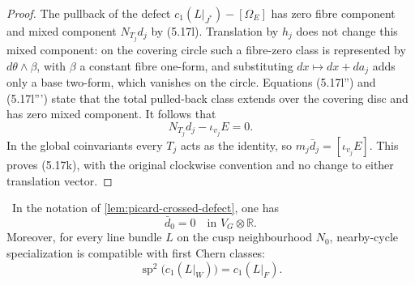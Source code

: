 \begin{proof}
The pullback of the defect
\(c_1(L|_{J^*})-[\Omega_E]\) has zero fibre component and mixed
component \(N_{T_j}d_j\) by (5.17l).  Translation by \(h_j\) does
not change this mixed component: on the covering circle such
a fibre-zero class is represented by
\(d\theta\wedge\beta\), with \(\beta\) a constant fibre one-form,
and substituting \(dx\mapsto dx+d a_j\) adds only a base two-form,
which vanishes on the circle.  Equations (5.17l'') and
(5.17l''') state that the total pulled-back class extends over
the covering disc and has zero mixed component.  It follows that
\[
 N_{T_j}d_j-\iota_{v_j}E=0.
\]
In the global coinvariants every \(T_j\) acts as the identity,
so \(m_j\bar d_j=[\iota_{v_j}E]\).  This proves (5.17k), with the
original clockwise convention and no change to either translation
vector.
\end{proof}

\begin{lemma}
\label{lem:picard-cusp-defect}
\Verified\ In the notation of
\cref{lem:picard-crossed-defect}, one has
\[
 \bar d_0=0\quad\text{in }V_G\otimes\mathbb R.
\tag{5.17n}
\]
Moreover, for every line bundle $L$ on the cusp neighbourhood $N_0$,
nearby-cycle specialization is compatible with first Chern classes:
\[
 \operatorname{sp}^2\bigl(c_1(L|_W)\bigr)=c_1(L|_F).
\tag{5.17o}
\]
\end{lemma}

